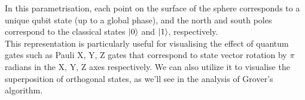 In this parametrisation, each point on the surface of the sphere corresponds to a unique qubit state (up to a global phase), and the north and south poles correspond to the classical states $\ket{0}$ and $\ket{1}$, respectively.\\

This representation is particularly useful for visualising the effect of quantum gates such as Pauli X, Y, Z gates that correspond to state vector rotation by $\pi$ radians in the X, Y, Z axes respectively. We can also utilize it to visualise the superposition of orthogonal states, as we'll see in the analysis of Grover's algorithm.